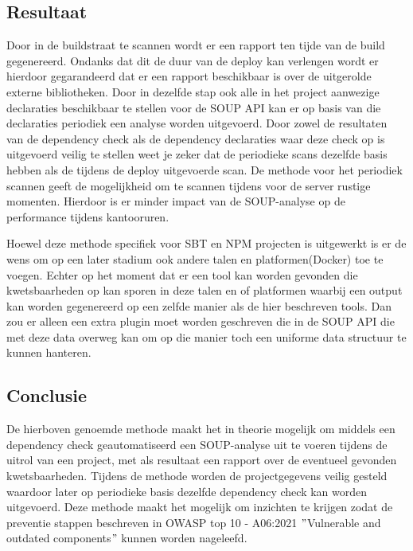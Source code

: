 \subsection{Resultaat}\label{subsec:resultaat}
Door in de buildstraat te scannen wordt er een rapport ten tijde van de build gegenereerd. Ondanks dat dit de duur van de deploy kan verlengen wordt er hierdoor gegarandeerd dat er een rapport beschikbaar is over de uitgerolde externe bibliotheken. Door in dezelfde stap ook alle in het project aanwezige declaraties beschikbaar te stellen voor de SOUP API kan er op basis van die declaraties periodiek een analyse worden uitgevoerd. Door zowel de resultaten van de dependency check als de dependency declaraties waar deze check op is uitgevoerd veilig te stellen weet je zeker dat de periodieke scans dezelfde basis hebben als de tijdens de deploy uitgevoerde scan. De methode voor het periodiek scannen geeft de mogelijkheid om te scannen tijdens voor de server rustige momenten. Hierdoor is er minder impact van de SOUP-analyse op de performance tijdens kantooruren.

Hoewel deze methode specifiek voor SBT en NPM projecten is uitgewerkt is er de wens om op een later stadium ook andere talen en platformen(Docker) toe te voegen. Echter op het moment dat er een tool kan worden gevonden die kwetsbaarheden op kan sporen in deze talen en of platformen waarbij een output kan worden gegenereerd op een zelfde manier als de hier beschreven tools. Dan zou er alleen een extra plugin moet worden geschreven die in de SOUP API die met deze data overweg kan om op die manier toch een uniforme data structuur te kunnen hanteren.

\subsection{Conclusie}\label{subsec:conclusie}
De hierboven genoemde methode maakt het in theorie mogelijk om middels een dependency check geautomatiseerd een SOUP-analyse uit te voeren tijdens de uitrol van een project, met als resultaat een rapport over de eventueel gevonden kwetsbaarheden. Tijdens de methode worden de projectgegevens veilig gesteld waardoor later op periodieke basis dezelfde dependency check kan worden uitgevoerd.
Deze methode maakt het mogelijk om inzichten te krijgen zodat de preventie stappen beschreven in OWASP top 10 - A06:2021 $"$Vulnerable and outdated components$"$ kunnen worden nageleefd.


